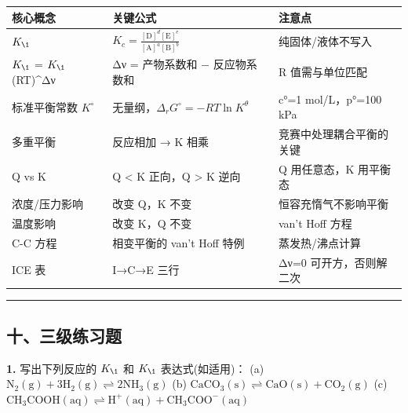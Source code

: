 {\def\LTcaptype{none} %
\begin{longtable}[]{@{}
  >{\raggedright\arraybackslash}p{}
  >{\raggedright\arraybackslash}p{}
  >{\raggedright\arraybackslash}p{}@{}}
\toprule\noalign{}
\begin{minipage}[b]{\linewidth}\raggedright
核心概念
\end{minipage} & \begin{minipage}[b]{\linewidth}\raggedright
关键公式
\end{minipage} & \begin{minipage}[b]{\linewidth}\raggedright
注意点
\end{minipage} \\
\midrule\noalign{}
\endhead
\bottomrule\noalign{}
\endlastfoot
\(K_{\1}\) & \(K_c = \frac{[\mathrm{D}]^d[\mathrm{E}]^e}{[\mathrm{A}]^a[\mathrm{B}]^b}\) & 纯固体/液体不写入 \\
\(K_{\1}\) = \(K_{\1}\)(RT)\^{}Δν & Δν = 产物系数和 − 反应物系数和 & R 值需与单位匹配 \\
标准平衡常数 \(K^{\circ}\) & 无量纲，\(\Delta_rG^\circ = -RT\ln K^\theta\) & c°=1 mol/L，p°=100 kPa \\
多重平衡 & 反应相加 → K 相乘 & 竞赛中处理耦合平衡的关键 \\
Q vs K & Q \textless{} K 正向，Q \textgreater{} K 逆向 & Q 用任意态，K 用平衡态 \\
浓度/压力影响 & 改变 Q，K 不变 & 恒容充惰气不影响平衡 \\
温度影响 & 改变 K，Q 不变 & van't Hoff 方程 \\
C-C 方程 & 相变平衡的 van't Hoff 特例 & 蒸发热/沸点计算 \\
ICE 表 & I→C→E 三行 & Δν=0 可开方，否则解二次 \\
\end{longtable}
}

\begin{center}\rule{0.5\linewidth}{0.5pt}\end{center}

\subsection{十、三级练习题}\label{ux5341ux4e09ux7ea7ux7ec3ux4e60ux9898}

\textbf{1.} 写出下列反应的 \(K_{\1}\) 和 \(K_{\1}\) 表达式(如适用)：
(a) \(\mathrm{N_2(g) + 3H_2(g) \rightleftharpoons 2NH_3(g)}\)
(b) \(\mathrm{CaCO_3(s) \rightleftharpoons CaO(s) + CO_2(g)}\)
(c) \(\mathrm{CH_3COOH(aq) \rightleftharpoons H^+(aq) + CH_3COO^-(aq)}\)

